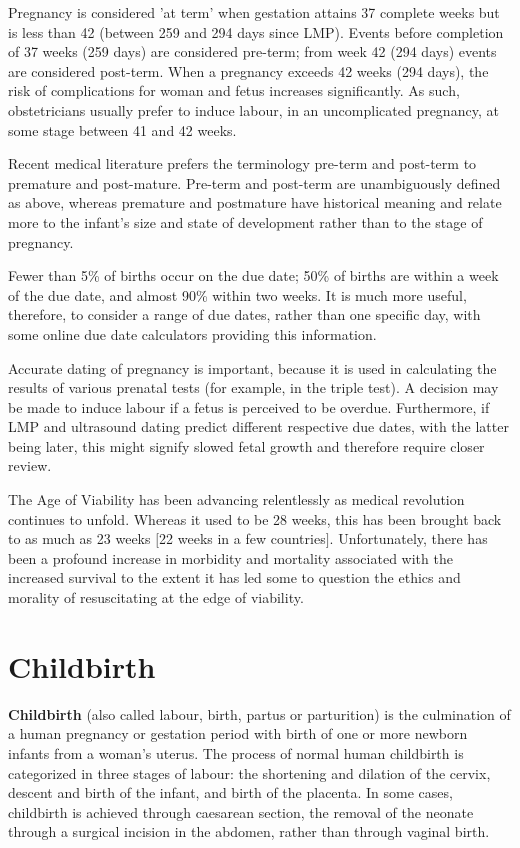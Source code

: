 \documentclass[12pt,a4paper,onecolumn]{article}
\begin{document}
Pregnancy is considered 'at term' when gestation attains 37 complete weeks but is less than 42
(between 259 and 294 days since LMP). Events before completion of 37 weeks (259 days) are considered
pre-term; from week 42 (294 days) events are considered post-term. When a pregnancy exceeds 42 weeks
(294 days), the risk of complications for woman and fetus increases significantly. As such,
obstetricians usually prefer to induce labour, in an uncomplicated pregnancy, at some stage between
41 and 42 weeks.

Recent medical literature prefers the terminology pre-term and post-term to premature and
post-mature. Pre-term and post-term are unambiguously defined as above, whereas premature and
postmature have historical meaning and relate more to the infant's size and state of development
rather than to the stage of pregnancy.

Fewer than 5\% of births occur on the due date; 50\% of births are within a week of the due date,
and almost 90\% within two weeks. It is much more useful, therefore, to consider a range of due
dates, rather than one specific day, with some online due date calculators providing this
information.

Accurate dating of pregnancy is important, because it is used in calculating the results of various
prenatal tests (for example, in the triple test). A decision may be made to induce labour if a fetus
is perceived to be overdue. Furthermore, if LMP and ultrasound dating predict different respective
due dates, with the latter being later, this might signify slowed fetal growth and therefore require
closer review.

The Age of Viability has been advancing relentlessly as medical revolution continues to unfold.
Whereas it used to be 28 weeks, this has been brought back to as much as 23 weeks $[$22 weeks in a
few countries$]$. Unfortunately, there has been a profound increase in morbidity and mortality
associated with the increased survival to the extent it has led some to question the ethics and
morality of resuscitating at the edge of viability.



\section{Childbirth}

\textbf{Childbirth} (also called labour, birth, partus or parturition) is the culmination of a human
pregnancy or gestation period with birth of one or more newborn infants from a woman's uterus. The
process of normal human childbirth is categorized in three stages of labour: the shortening and
dilation of the cervix, descent and birth of the infant, and birth of the placenta. In some cases,
childbirth is achieved through caesarean section, the removal of the neonate through a surgical
incision in the abdomen, rather than through vaginal birth.
\end{document}
